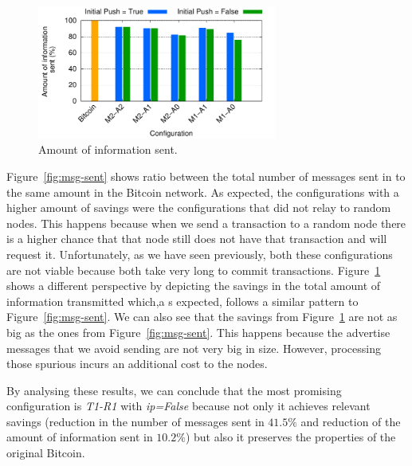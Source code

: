 \begin{figure}
\centering
\includegraphics[width=0.7\textwidth]{plots/mb-sent.pdf}
\caption{Amount of information sent.}
\label{fig:mb-sent}
\end{figure}

Figure~\ref{fig:msg-sent} shows ratio between the total number of messages sent in to the same amount in the Bitcoin network. As expected, the configurations with a higher amount of savings were the configurations that did not relay to random nodes. This happens because when we send a transaction to a random node there is a higher chance that that node still does not have that transaction and will request it. Unfortunately, as we have seen previously, both these configurations are not viable because both take very long to commit transactions. Figure~\ref{fig:mb-sent} shows a different perspective by depicting the savings in the total amount of information transmitted which,a s expected, follows a similar pattern to Figure~\ref{fig:msg-sent}. We can also see that the savings from Figure~\ref{fig:mb-sent} are not as big as the ones from Figure~\ref{fig:msg-sent}.
This happens because the advertise messages that we avoid sending are not very big in size. However, processing those spurious incurs an additional cost to the nodes.

By analysing these results, we can conclude that the most promising configuration is \textsl{T1-R1} with \textsl{ip=False} because not only  it achieves relevant savings (reduction in the number of messages sent in $41.5\%$ and reduction of the amount of information sent in $10.2\%$) but also it preserves the properties of the original Bitcoin.

